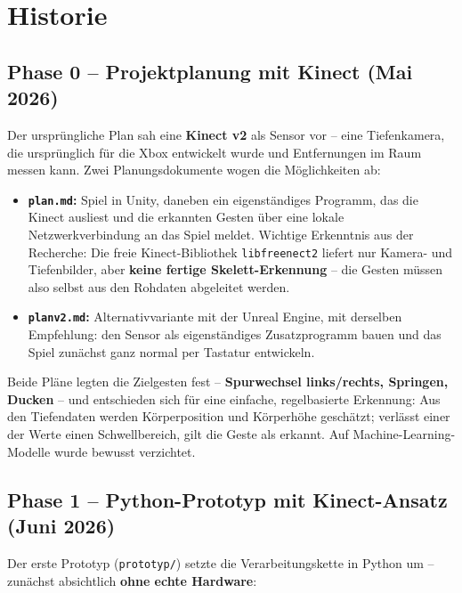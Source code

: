 \documentclass[12pt,a4paper]{article}
\newcommand{\code}[1]{\texttt{#1}}
\begin{document}
\section{Historie}

\subsection{Phase 0 -- Projektplanung mit Kinect (Mai 2026)}

Der ursprüngliche Plan sah eine \textbf{Kinect v2} als Sensor vor -- eine Tiefenkamera, die ursprünglich für die Xbox entwickelt wurde und Entfernungen im Raum messen kann. Zwei Planungsdokumente wogen die Möglichkeiten ab:

\begin{itemize}[leftmargin=*]
    \item \textbf{\code{plan.md}:} Spiel in Unity, daneben ein eigenständiges Programm, das die Kinect ausliest und die erkannten Gesten über eine lokale Netzwerkverbindung an das Spiel meldet. Wichtige Erkenntnis aus der Recherche: Die freie Kinect-Bibliothek \code{libfreenect2} liefert nur Kamera- und Tiefenbilder, aber \textbf{keine fertige Skelett-Erkennung} -- die Gesten müssen also selbst aus den Rohdaten abgeleitet werden.
    \item \textbf{\code{planv2.md}:} Alternativvariante mit der Unreal Engine, mit derselben Empfehlung: den Sensor als eigenständiges Zusatzprogramm bauen und das Spiel zunächst ganz normal per Tastatur entwickeln.
\end{itemize}

Beide Pläne legten die Zielgesten fest -- \textbf{Spurwechsel links/rechts, Springen, Ducken} -- und entschieden sich für eine einfache, regelbasierte Erkennung: Aus den Tiefendaten werden Körperposition und Körperhöhe geschätzt; verlässt einer der Werte einen Schwellbereich, gilt die Geste als erkannt. Auf Machine-Learning-Modelle wurde bewusst verzichtet.

\subsection{Phase 1 -- Python-Prototyp mit Kinect-Ansatz (Juni 2026)}

Der erste Prototyp (\code{prototyp/}) setzte die Verarbeitungskette in Python um -- zunächst absichtlich \textbf{ohne echte Hardware}:
\end{document}
